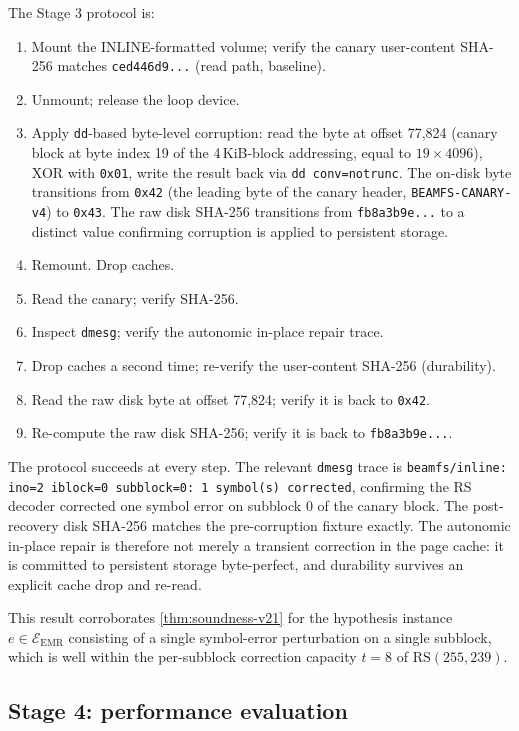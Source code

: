 The Stage 3 protocol is:

\begin{enumerate}
\item Mount the INLINE-formatted volume; verify the canary
  user-content SHA-256 matches \texttt{ced446d9...} (read path,
  baseline).
\item Unmount; release the loop device.
\item Apply \texttt{dd}-based byte-level corruption: read the
  byte at offset 77{,}824 (canary block at byte index 19 of the
  4\,KiB-block addressing, equal to \(19 \times 4096\)), XOR with
  \texttt{0x01}, write the result back via \texttt{dd
  conv=notrunc}. The on-disk byte transitions from \texttt{0x42}
  (the leading byte of the canary header,
  \texttt{BEAMFS-CANARY-v4}) to \texttt{0x43}. The raw disk
  SHA-256 transitions from \texttt{fb8a3b9e...} to a distinct
  value confirming corruption is applied to persistent storage.
\item Remount. Drop caches.
\item Read the canary; verify SHA-256.
\item Inspect \texttt{dmesg}; verify the autonomic in-place repair
  trace.
\item Drop caches a second time; re-verify the user-content
  SHA-256 (durability).
\item Read the raw disk byte at offset 77{,}824; verify it is
  back to \texttt{0x42}.
\item Re-compute the raw disk SHA-256; verify it is back to
  \texttt{fb8a3b9e...}.
\end{enumerate}

The protocol succeeds at every step. The relevant \texttt{dmesg}
trace is \texttt{beamfs/inline: ino=2 iblock=0 subblock=0: 1
symbol(s) corrected}, confirming the RS decoder corrected one
symbol error on subblock 0 of the canary block. The post-recovery
disk SHA-256 matches the pre-corruption fixture exactly. The
autonomic in-place repair is therefore not merely a transient
correction in the page cache: it is committed to persistent
storage byte-perfect, and durability survives an explicit cache
drop and re-read.

This result corroborates \cref{thm:soundness-v21} for the
hypothesis instance \(e \in \mathcal{E}_{\mathrm{EMR}}\) consisting
of a single symbol-error perturbation on a single subblock,
which is well within the per-subblock correction capacity \(t = 8\)
of \(\mathrm{RS}(255, 239)\).

\subsection{Stage 4: performance evaluation}\label{ssec:stage4}

